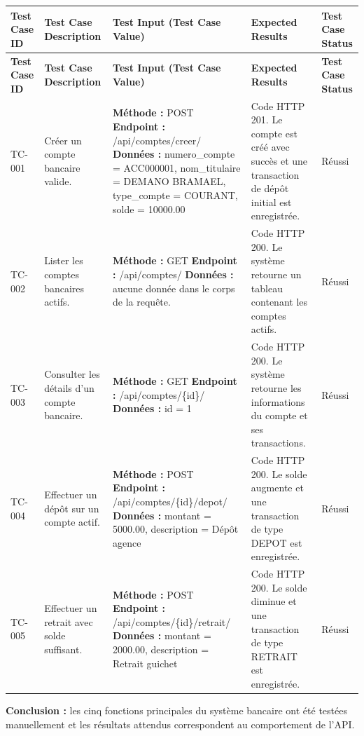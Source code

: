 \documentclass[10pt,a4paper]{article}
\begin{document}
{\small
\begin{longtable}{|P{2.1cm}|P{4.8cm}|P{7.1cm}|P{6.2cm}|P{2.4cm}|}
\hline
{}
\textbf{Test Case ID} &
\textbf{Test Case Description} &
\textbf{Test Input (Test Case Value)} &
\textbf{Expected Results} &
\textbf{Test Case Status} \\
\hline
\endfirsthead

\hline
{}
\textbf{Test Case ID} &
\textbf{Test Case Description} &
\textbf{Test Input (Test Case Value)} &
\textbf{Expected Results} &
\textbf{Test Case Status} \\
\hline
\endhead

TC-001 &
Créer un compte bancaire valide. &
\textbf{Méthode :} POST\newline
\textbf{Endpoint :} /api/comptes/creer/\newline
\textbf{Données :} numero\_compte = ACC000001, nom\_titulaire = DEMANO BRAMAEL, type\_compte = COURANT, solde = 10000.00 &
Code HTTP 201. Le compte est créé avec succès et une transaction de dépôt initial est enregistrée. &
Réussi \\
\hline

TC-002 &
Lister les comptes bancaires actifs. &
\textbf{Méthode :} GET\newline
\textbf{Endpoint :} /api/comptes/\newline
\textbf{Données :} aucune donnée dans le corps de la requête. &
Code HTTP 200. Le système retourne un tableau contenant les comptes actifs. &
Réussi \\
\hline

TC-003 &
Consulter les détails d'un compte bancaire. &
\textbf{Méthode :} GET\newline
\textbf{Endpoint :} /api/comptes/\{id\}/\newline
\textbf{Données :} id = 1 &
Code HTTP 200. Le système retourne les informations du compte et ses transactions. &
Réussi \\
\hline

TC-004 &
Effectuer un dépôt sur un compte actif. &
\textbf{Méthode :} POST\newline
\textbf{Endpoint :} /api/comptes/\{id\}/depot/\newline
\textbf{Données :} montant = 5000.00, description = Dépôt agence &
Code HTTP 200. Le solde augmente et une transaction de type DEPOT est enregistrée. &
Réussi \\
\hline

TC-005 &
Effectuer un retrait avec solde suffisant. &
\textbf{Méthode :} POST\newline
\textbf{Endpoint :} /api/comptes/\{id\}/retrait/\newline
\textbf{Données :} montant = 2000.00, description = Retrait guichet &
Code HTTP 200. Le solde diminue et une transaction de type RETRAIT est enregistrée. &
Réussi \\
\hline
\end{longtable}
}

\vspace{0.2cm}

\noindent\textbf{Conclusion :} les cinq fonctions principales du système bancaire ont été testées manuellement et les résultats attendus correspondent au comportement de l'API.
\end{document}
